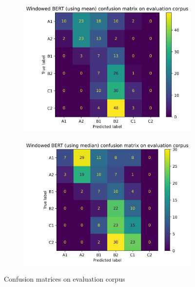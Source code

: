 \documentclass[11pt,a4paper]{article}
\begin{document}
\begin{figure}
\begin{subfigure}{0.45\textwidth}
  \end{subfigure}
  \begin{subfigure}{0.5\textwidth}
    \centering
    \includegraphics[width=1\textwidth]{figures/confusion-matrix-windowed-mean.png}
  \end{subfigure}%
  \begin{subfigure}{0.5\textwidth}
    \centering
    \includegraphics[width=1\textwidth]{figures/confusion-matrix-windowed-median.png}
  \end{subfigure}
  \caption{Confusion matrices on evaluation corpus}
  \label{fig:confusion-matrices}
\end{figure}
\end{document}
